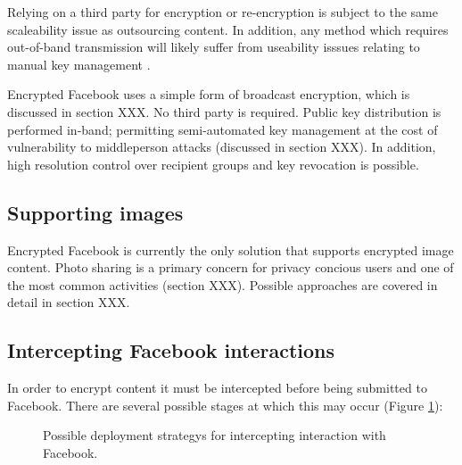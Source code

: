 Relying on a third party for encryption or re-encryption is subject to the same scaleability issue as outsourcing content. In addition, any method which requires out-of-band transmission will likely suffer from useability isssues relating to manual key management \cite{johhny}.   

Encrypted Facebook uses a simple form of broadcast encryption, which is discussed in section XXX. No third party is required. Public key distribution is performed in-band; permitting semi-automated key management at the cost of vulnerability to middleperson attacks (discussed in section XXX). In addition, high resolution control over recipient groups and key revocation is possible.


\subsection{Supporting images}

Encrypted Facebook is currently the only solution that supports encrypted image content. Photo sharing is a primary concern for privacy concious users \cite{photos-priv} and one of the most common activities (section XXX). Possible approaches are covered in detail in section XXX.



\subsection{Intercepting Facebook interactions}

In order to encrypt content it must be intercepted before being submitted to Facebook. There are several possible stages at which this may occur (Figure \ref{fig:approaches}):

\begin{figure}[tbph]
\begin{center}
    
\caption{Possible deployment strategys for intercepting interaction with Facebook.}
\label{fig:approaches}
\end{center}
\end{figure}

